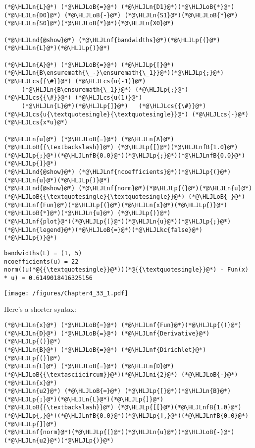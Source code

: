 \documentclass[12pt,a4paper]{article}
\newcommand{\HLJLkc}[1]{\textcolor[RGB]{59,151,46}{\textit{#1}}}
\newcommand{\HLJLn}[1]{#1}
\newcommand{\HLJLnd}[1]{\textcolor[RGB]{214,102,97}{#1}}
\newcommand{\HLJLnf}[1]{\textcolor[RGB]{66,102,213}{#1}}
\newcommand{\HLJLnfB}[1]{\textcolor[RGB]{59,151,46}{#1}}
\newcommand{\HLJLni}[1]{\textcolor[RGB]{59,151,46}{#1}}
\newcommand{\HLJLoB}[1]{\textcolor[RGB]{102,102,102}{\textbf{#1}}}
\newcommand{\HLJLp}[1]{#1}
\newcommand{\HLJLcs}[1]{\textcolor[RGB]{153,153,119}{\textit{#1}}}
\begin{document}
\begin{lstlisting}
(*@\HLJLn{L}@*) (*@\HLJLoB{=}@*) (*@\HLJLn{D1}@*)(*@\HLJLoB{*}@*)(*@\HLJLn{D0}@*) (*@\HLJLoB{-}@*) (*@\HLJLn{S1}@*)(*@\HLJLoB{*}@*)(*@\HLJLn{S0}@*)(*@\HLJLoB{*}@*)(*@\HLJLn{X0}@*)

(*@\HLJLnd{@show}@*) (*@\HLJLnf{bandwidths}@*)(*@\HLJLp{(}@*)(*@\HLJLn{L}@*)(*@\HLJLp{)}@*)

(*@\HLJLn{A}@*) (*@\HLJLoB{=}@*) (*@\HLJLp{[}@*)(*@\HLJLn{B\ensuremath{\_-}\ensuremath{\_1}}@*)(*@\HLJLp{;}@*)   (*@\HLJLcs{{\#}}@*) (*@\HLJLcs{u(-1)}@*)
     (*@\HLJLn{B\ensuremath{\_1}}@*) (*@\HLJLp{;}@*)   (*@\HLJLcs{{\#}}@*) (*@\HLJLcs{u(1)}@*)
     (*@\HLJLn{L}@*)(*@\HLJLp{]}@*)   (*@\HLJLcs{{\#}}@*) (*@\HLJLcs{u{\textquotesingle}{\textquotesingle}}@*) (*@\HLJLcs{-}@*) (*@\HLJLcs{x*u}@*)

(*@\HLJLn{u}@*) (*@\HLJLoB{=}@*) (*@\HLJLn{A}@*) (*@\HLJLoB{{\textbackslash}}@*) (*@\HLJLp{[}@*)(*@\HLJLnfB{1.0}@*)(*@\HLJLp{;}@*)(*@\HLJLnfB{0.0}@*)(*@\HLJLp{;}@*)(*@\HLJLnfB{0.0}@*)(*@\HLJLp{]}@*)
(*@\HLJLnd{@show}@*) (*@\HLJLnf{ncoefficients}@*)(*@\HLJLp{(}@*)(*@\HLJLn{u}@*)(*@\HLJLp{)}@*)
(*@\HLJLnd{@show}@*) (*@\HLJLnf{norm}@*)(*@\HLJLp{(}@*)(*@\HLJLn{u}@*)(*@\HLJLoB{{\textquotesingle}{\textquotesingle}}@*) (*@\HLJLoB{-}@*) (*@\HLJLnf{Fun}@*)(*@\HLJLp{(}@*)(*@\HLJLn{x}@*)(*@\HLJLp{)}@*)(*@\HLJLoB{*}@*)(*@\HLJLn{u}@*) (*@\HLJLp{)}@*)
(*@\HLJLnf{plot}@*)(*@\HLJLp{(}@*)(*@\HLJLn{u}@*)(*@\HLJLp{;}@*) (*@\HLJLn{legend}@*)(*@\HLJLoB{=}@*)(*@\HLJLkc{false}@*)(*@\HLJLp{)}@*)
\end{lstlisting}

\begin{lstlisting}
bandwidths(L) = (1, 5)
ncoefficients(u) = 22
norm((u(*@{{\textquotesingle}}@*))(*@{{\textquotesingle}}@*) - Fun(x) * u) = 0.6149018416325156
\end{lstlisting}

\texttt{[image: /figures/Chapter4\_33\_1.pdf]}

Here's a shorter syntax:


\begin{lstlisting}
(*@\HLJLn{x}@*) (*@\HLJLoB{=}@*) (*@\HLJLnf{Fun}@*)(*@\HLJLp{()}@*)
(*@\HLJLn{D}@*) (*@\HLJLoB{=}@*) (*@\HLJLnf{Derivative}@*)(*@\HLJLp{()}@*)
(*@\HLJLn{B}@*) (*@\HLJLoB{=}@*) (*@\HLJLnf{Dirichlet}@*)(*@\HLJLp{()}@*)
(*@\HLJLn{L}@*) (*@\HLJLoB{=}@*) (*@\HLJLn{D}@*)(*@\HLJLoB{{\textasciicircum}}@*)(*@\HLJLni{2}@*) (*@\HLJLoB{-}@*) (*@\HLJLn{x}@*)
(*@\HLJLn{u2}@*) (*@\HLJLoB{=}@*) (*@\HLJLp{[}@*)(*@\HLJLn{B}@*)(*@\HLJLp{;}@*)(*@\HLJLn{L}@*)(*@\HLJLp{]}@*) (*@\HLJLoB{{\textbackslash}}@*) (*@\HLJLp{[[}@*)(*@\HLJLnfB{1.0}@*)(*@\HLJLp{,}@*)(*@\HLJLnfB{0.0}@*)(*@\HLJLp{],}@*)(*@\HLJLnfB{0.0}@*)(*@\HLJLp{]}@*)
(*@\HLJLnf{norm}@*)(*@\HLJLp{(}@*)(*@\HLJLn{u}@*)(*@\HLJLoB{-}@*)(*@\HLJLn{u2}@*)(*@\HLJLp{)}@*)
\end{lstlisting}
\end{document}
